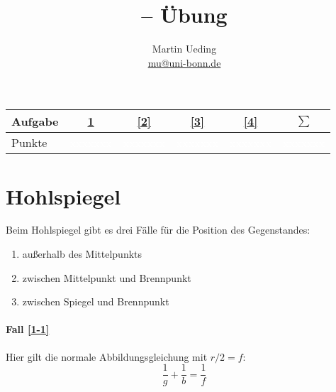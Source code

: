 \documentclass[11pt, ngerman, fleqn]{article}
\title{\themodul{} -- Übung \theuebung \\ \vspace{0.5cm} \large{\thegruppe}}
\author{Martin Ueding \\ \small{\href{mailto:mu@uni-bonn.de}{mu@uni-bonn.de}}}
\newcommand{\punkte}{\textcolor{white}{xxxxxxx}}
\begin{document}
\maketitle

\begin{table}[h]
	\centering
	\begin{tabular}{l|c|c|c|c|c}
		Aufgabe & \ref{1} & \ref{2} & \ref{3} & \ref{4} & $\sum$   \\
		\hline
		Punkte & \punkte & \punkte & \punkte & \punkte & \punkte
	\end{tabular}
\end{table}


\section{Hohlspiegel}
\label{1}

Beim Hohlspiegel gibt es drei Fälle für die Position des Gegenstandes:
\begin{enumerate}
	\item \label{1-1} außerhalb des Mittelpunkts
	\item \label{1-2} zwischen Mittelpunkt und Brennpunkt
	\item \label{1-3} zwischen Spiegel und Brennpunkt
\end{enumerate}

\paragraph{Fall \ref{1-1}}

Hier gilt die normale Abbildungsgleichung mit $r/2 = f$:
\begin{equation}
	\label{eq:abb}
	\frac 1g + \frac 1b = \frac 1f
\end{equation}
\end{document}
